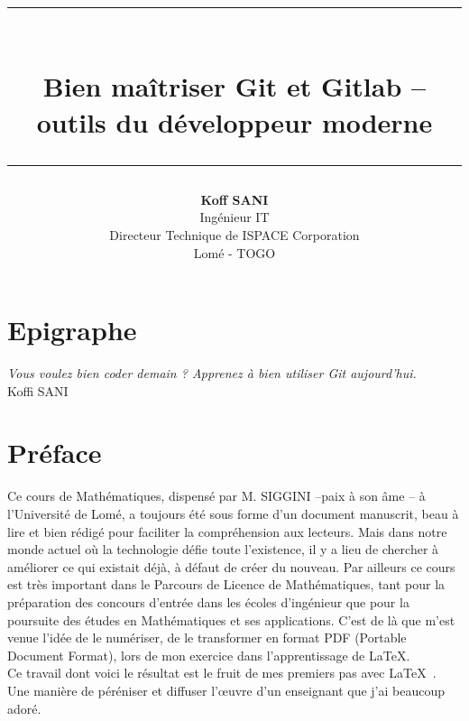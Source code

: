 \documentclass[11pt, a4paper]{book}
\author{\textbf{Koff SANI} \\ Ing\'enieur IT \\ Directeur Technique de ISPACE Corporation \\ Lomé - TOGO}
\begin{document}
\title{ \begin{figure} \begin{center}
 \end{center} \end{figure}
 \rule{13cm}{0.15cm}\\
  \textbf{\textbf{ Bien ma\^itriser Git et Gitlab -- outils du développeur moderne }}\\ 
 \rule{13cm
}{0.15cm}
}
 
\date{}

\maketitle
\chapter*{Epigraphe}
\begin{flushright}
\emph{ Vous voulez bien coder demain ? Apprenez à bien utiliser Git aujourd'hui.}\\ Koffi SANI
\end{flushright}
\chapter*{Préface}
Ce cours de Math\'ematiques, dispens\'e par M. SIGGINI --paix à son âme -- \`a l'Universit\'e de Lom\'e, a toujours \'et\'e sous forme d'un document manuscrit, beau \`a lire et bien r\'edig\'e pour faciliter la compr\'ehension aux lecteurs. Mais dans notre monde actuel o\`u la technologie d\'efie toute l'existence, il y a lieu de chercher \`a am\'eliorer ce qui existait d\'ej\`a, \`a d\'efaut de cr\'eer du nouveau. Par ailleurs ce cours est tr\`es important dans le Parcours de Licence de Math\'ematiques, tant pour la pr\'eparation des concours d'entr\'ee dans les \'ecoles d'ing\'enieur que pour la poursuite des \'etudes en Math\'ematiques et ses applications. C'est de l\`a que m'est venue l'id\'ee de le num\'eriser, de le transformer en format PDF (Portable Document Format), lors de mon exercice dans l'apprentissage de \LaTeX.\\

 Ce travail dont voici le r\'esultat est le fruit de mes premiers pas avec \LaTeX\ . Une manière de péréniser et diffuser l'\oe uvre d'un enseignant que j'ai beaucoup adoré.\\
 
\end{document}
